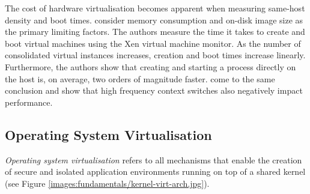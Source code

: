 The cost of hardware virtualisation becomes apparent when measuring same-host density
and boot times. \textcite{10.1145/3132747.3132763} consider memory consumption and on-disk image size
as the primary limiting factors. The authors measure the time it takes to create and boot
virtual machines using the Xen virtual machine monitor.
As the number of consolidated virtual instances increases, creation and boot times increase linearly. 
Furthermore, the authors show that creating and starting a process directly on the host is, on average, 
two orders of magnitude faster. \textcite{10.1145/2151024.2151030} come to the same conclusion and show
that high frequency context switches also negatively impact performance. 

\subsection{Operating System Virtualisation}
\label{ch:fundamentals/virtualisation/os-virtualisation}
\textit{Operating system virtualisation} refers to all mechanisms that enable the creation of secure
and isolated application environments running on top of a shared kernel (see Figure 
\ref{images:fundamentals/kernel-virt-arch.jpg}). 

